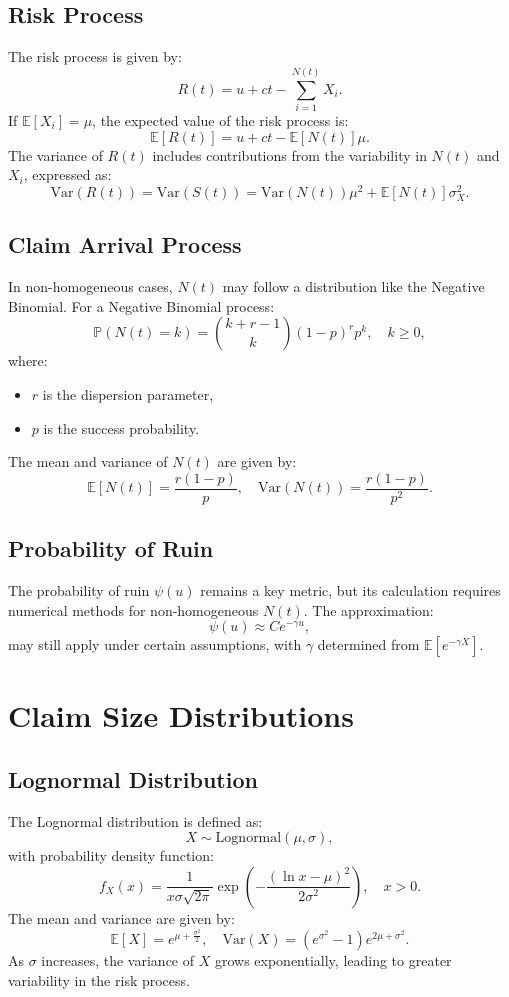 \documentclass[12pt]{article}
\begin{document}
	\subsection{Risk Process}
	The risk process is given by:
	\[
	R(t) = u + ct - \sum_{i=1}^{N(t)} X_i.
	\]
	If $\mathbb{E}[X_i] = \mu$, the expected value of the risk process is:
	\[
	\mathbb{E}[R(t)] = u + ct - \mathbb{E}[N(t)] \mu.
	\]
	The variance of $R(t)$ includes contributions from the variability in $N(t)$ and $X_i$, expressed as:
	\[
	\text{Var}(R(t)) = \text{Var}(S(t)) = \text{Var}(N(t)) \mu^2 + \mathbb{E}[N(t)] \sigma_X^2.
	\]
	
	\subsection{Claim Arrival Process}
	In non-homogeneous cases, $N(t)$ may follow a distribution like the Negative Binomial. For a Negative Binomial process:
	\[
	\mathbb{P}(N(t) = k) = \binom{k + r - 1}{k} (1 - p)^r p^k, \quad k \geq 0,
	\]
	where:
	\begin{itemize}
		\item $r$ is the dispersion parameter,
		\item $p$ is the success probability.
	\end{itemize}
	The mean and variance of $N(t)$ are given by:
	\[
	\mathbb{E}[N(t)] = \frac{r(1-p)}{p}, \quad \text{Var}(N(t)) = \frac{r(1-p)}{p^2}.
	\]
	
	\subsection{Probability of Ruin}
	The probability of ruin $\psi(u)$ remains a key metric, but its calculation requires numerical methods for non-homogeneous $N(t)$. The approximation:
	\[
	\psi(u) \approx Ce^{-\gamma u},
	\]
	may still apply under certain assumptions, with $\gamma$ determined from $\mathbb{E}[e^{-\gamma X}]$.
	
	\section{Claim Size Distributions}
	\subsection{Lognormal Distribution}
	The Lognormal distribution is defined as:
	\[
	X \sim \text{Lognormal}(\mu, \sigma),
	\]
	with probability density function:
	\[
	f_X(x) = \frac{1}{x \sigma \sqrt{2\pi}} \exp\left(-\frac{(\ln x - \mu)^2}{2\sigma^2}\right), \quad x > 0.
	\]
	The mean and variance are given by:
	\[
	\mathbb{E}[X] = e^{\mu + \frac{\sigma^2}{2}}, \quad \text{Var}(X) = \left(e^{\sigma^2} - 1\right)e^{2\mu + \sigma^2}.
	\]
	As $\sigma$ increases, the variance of $X$ grows exponentially, leading to greater variability in the risk process.
	
\end{document}
